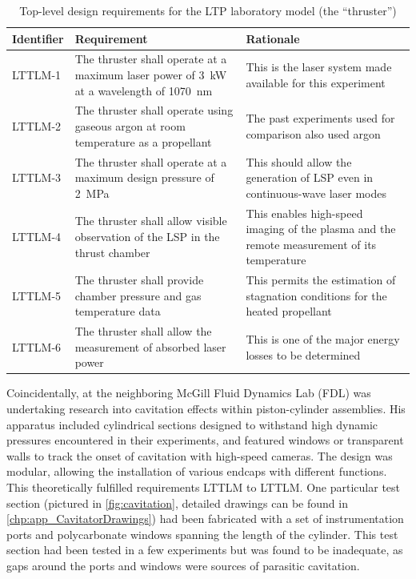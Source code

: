             \begin{table}[h]
                \renewcommand{\arraystretch}{1.3}
                \centering
                \caption[Top-level design requirements for the LTP laboratory model]{Top-level design requirements for the LTP laboratory model (the ``thruster'')}
                \label{tab:lttmReq}
                \begin{tabular}{l>{\raggedright}p{}p{}<{\raggedright}}
                    \toprule
                    Identifier  & Requirement   & Rationale \\
                    \midrule
                    LTTLM-1     & The thruster shall operate at a maximum laser power of \qty{3}{kW} at a wavelength of \qty{1070}{nm}    & This is the laser system made available for this experiment \\
                    LTTLM-2     & The thruster shall operate using gaseous argon at room temperature as a propellant & The past experiments used for comparison also used argon \\
                    LTTLM-3     & The thruster shall operate at a maximum design pressure of 2~\unit{MPa} & This should allow the generation of LSP even in continuous-wave laser modes \\
                    LTTLM-4     & The thruster shall allow visible observation of the LSP in the thrust chamber & This enables high-speed imaging of the plasma and the remote measurement of its temperature \\
                    LTTLM-5     & The thruster shall provide chamber pressure and gas temperature data   & This permits the estimation of stagnation conditions for the heated propellant \\
                    LTTLM-6     & The thruster shall allow the measurement of absorbed laser power   & This is one of the major energy losses to be determined \\
                    \bottomrule
                \end{tabular}
            \end{table}

            Coincidentally, \textcite{kokkalisOnsetCavitationDynamically2023} at the neighboring McGill Fluid Dynamics Lab (FDL) was undertaking research into cavitation effects within piston-cylinder assemblies. His apparatus included cylindrical sections designed to withstand high dynamic pressures encountered in their experiments, and featured windows or transparent walls to track the onset of cavitation with high-speed cameras. The design was modular, allowing the installation of various endcaps with different functions. This theoretically fulfilled requirements LTTLM to LTTLM. One particular test section (pictured in \autoref{fig:cavitation}, detailed drawings can be found in \autoref{chp:app_CavitatorDrawings}) had been fabricated with a set of instrumentation ports and polycarbonate windows spanning the length of the cylinder. This test section had been tested in a few experiments but was found to be inadequate, as gaps around the ports and windows were sources of parasitic cavitation.

